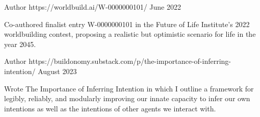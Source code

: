 


\begin{cventries}


\cventry
{Author} %
{} %
{https://worldbuild.ai/W-0000000101/} %
{June 2022} %
{ %
\begin{cvitems}
\item {Co-authored finalist entry W-0000000101 in the Future of Life Institute's 2022 worldbuilding contest, proposing a realistic but optimistic scenario for life in the year 2045.}
\end{cvitems}
}

\cventry
{Author} %
{} %
{https://buildonomy.substack.com/p/the-importance-of-inferring-intention/} %
{August 2023} %
{
\begin{cvitems}
\item {Wrote The Importance of Inferring Intention in which I outline a framework for legibly, reliably, and modularly improving our innate capacity to infer our own intentions as well as the intentions of other agents we interact with.}
\end{cvitems}
}



\end{cventries}
